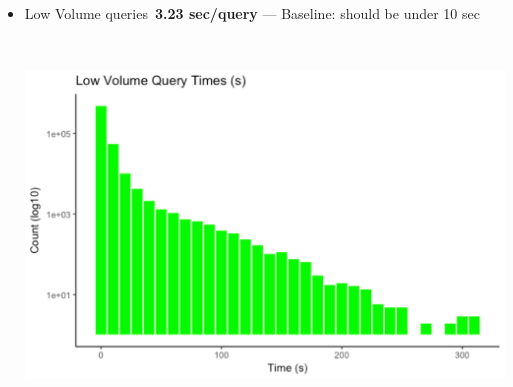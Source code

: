 \documentclass[DM,toc]{lsstdoc}
\begin{document}
\begin{itemize}
  \begin{itemize}
  \item
    Low Volume queries~\textbf{3.23 sec/query} --- Baseline: should be
    under 10
    sec\\[2\baselineskip]\includegraphics[width=6.50764in,height=4.18472in]{Picture1}


\end{itemize}
\end{itemize}
\end{document}
